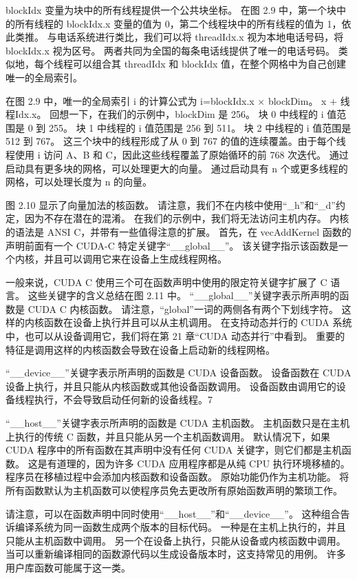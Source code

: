 blockIdx 变量为块中的所有线程提供一个公共块坐标。 在图 2.9 中，第一个块中的所有线程的 blockIdx.x 变量的值为 0，第二个线程块中的所有线程的值为 1，依此类推。 与电话系统进行类比，我们可以将 threadIdx.x 视为本地电话号码，将 blockIdx.x 视为区号。 两者共同为全国的每条电话线提供了唯一的电话号码。 类似地，每个线程可以组合其 threadIdx 和 blockIdx 值，在整个网格中为自己创建唯一的全局索引。

在图 2.9 中，唯一的全局索引 i 的计算公式为 i=blockIdx.x × blockDim。 x + 线程Idx.x。 回想一下，在我们的示例中，blockDim 是 256。 块 0 中线程的 i 值范围是 0 到 255。 块 1 中线程的 i 值范围是 256 到 511。 块 2 中线程的 i 值范围是 512 到 767。 这三个块中的线程形成了从 0 到 767 的值的连续覆盖。由于每个线程使用 i 访问 A、B 和 C，因此这些线程覆盖了原始循环的前 768 次迭代。 通过启动具有更多块的网格，可以处理更大的向量。 通过启动具有 n 个或更多线程的网格，可以处理长度为 n 的向量。

图 2.10 显示了向量加法的核函数。 请注意，我们不在内核中使用“\_h”和“\_d”约定，因为不存在潜在的混淆。 在我们的示例中，我们将无法访问主机内存。 内核的语法是 ANSI C，并带有一些值得注意的扩展。 首先，在 vecAddKernel 函数的声明前面有一个 CUDA-C 特定关键字“\_\_global\_\_”。 该关键字指示该函数是一个内核，并且可以调用它来在设备上生成线程网格。

一般来说，CUDA C 使用三个可在函数声明中使用的限定符关键字扩展了 C 语言。 这些关键字的含义总结在图 2.11 中。 “\_\_global\_\_”关键字表示所声明的函数是 CUDA C 内核函数。 请注意，“global”一词的两侧各有两个下划线字符。 这样的内核函数在设备上执行并且可以从主机调用。 在支持动态并行的 CUDA 系统中，也可以从设备调用它，我们将在第 21 章“CUDA 动态并行”中看到。 重要的特征是调用这样的内核函数会导致在设备上启动新的线程网格。

“\_\_device\_\_”关键字表示所声明的函数是 CUDA 设备函数。 设备函数在 CUDA 设备上执行，并且只能从内核函数或其他设备函数调用。 设备函数由调用它的设备线程执行，不会导致启动任何新的设备线程。7

“\_\_host\_\_”关键字表示所声明的函数是 CUDA 主机函数。 主机函数只是在主机上执行的传统 C 函数，并且只能从另一个主机函数调用。 默认情况下，如果 CUDA 程序中的所有函数在其声明中没有任何 CUDA 关键字，则它们都是主机函数。 这是有道理的，因为许多 CUDA 应用程序都是从纯 CPU 执行环境移植的。 程序员在移植过程中会添加内核函数和设备函数。 原始功能仍作为主机功能。 将所有函数默认为主机函数可以使程序员免去更改所有原始函数声明的繁琐工作。

请注意，可以在函数声明中同时使用“\_\_host\_\_”和“\_\_device\_\_”。 这种组合告诉编译系统为同一函数生成两个版本的目标代码。 一种是在主机上执行的，并且只能从主机函数中调用。 另一个在设备上执行，只能从设备或内核函数中调用。 当可以重新编译相同的函数源代码以生成设备版本时，这支持常见的用例。 许多用户库函数可能属于这一类。


